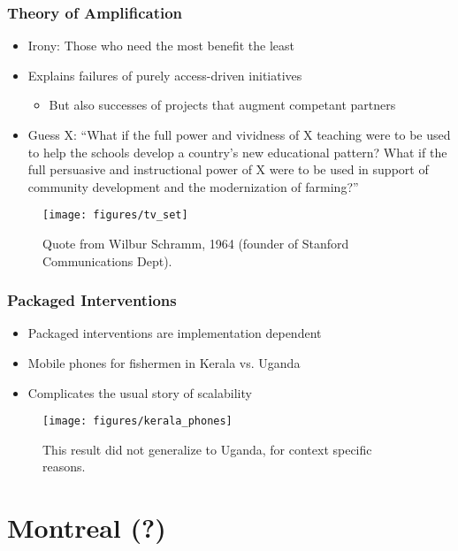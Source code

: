 \documentclass[10pt,mathserif]{beamer}
\begin{document}
\begin{frame}
  \frametitle{Theory of Amplification}
  \begin{itemize}
  \item Irony: Those who need the most benefit the least
  \item Explains failures of purely access-driven initiatives
    \begin{itemize}
    \item But also successes of projects that augment competant partners
    \end{itemize}
  \item Guess X: ``What if the full power and vividness of X teaching were to be
    used to help the schools develop a country's new educational pattern? What
    if the full persuasive and instructional power of X were to be used in
    support of community development and the modernization of farming?''
  \end{itemize}
\begin{figure}[ht]
  \centering
  \texttt{[image: figures/tv\_set]}
  \caption{Quote from Wilbur Schramm, 1964 (founder of Stanford Communications Dept).}
\end{figure}
\end{frame}


\begin{frame}
  \frametitle{Packaged Interventions}
 \begin{itemize}
  \item Packaged interventions are implementation dependent
  \item Mobile phones for fishermen in Kerala vs. Uganda
  \item Complicates the usual story of scalability
 \end{itemize}
\begin{figure}[ht]
  \centering
  \texttt{[image: figures/kerala\_phones]}
  \caption{This result did not generalize to Uganda, for context specific reasons. \label{fig:label} }
\end{figure}

\end{frame}


\section{Montreal (?)}
\label{sec:label}
\end{document}
